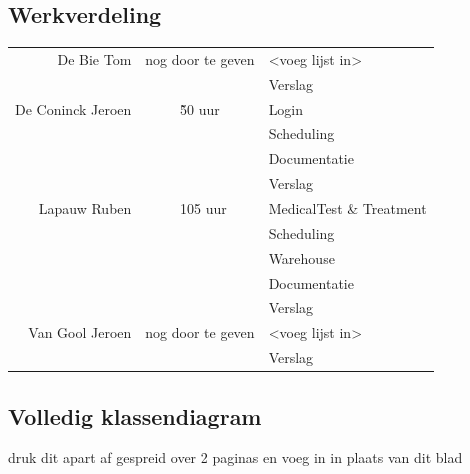 \documentclass[a4paper]{article}
\begin{document}
\subsection{Werkverdeling} %
\begin{center}
\begin{tabular}{| r || c | l |}
\hline
De Bie Tom & nog door te geven & <voeg lijst in> \\
~ & ~ & Verslag \\
\hline
De Coninck Jeroen & \~50 uur & Login \\
~ & ~ & Scheduling \\
~ & ~ & Documentatie \\
~ & ~ & Verslag \\
\hline
Lapauw Ruben & ~105 uur & MedicalTest \& Treatment \\
~ & ~ & Scheduling \\
~ & ~ & Warehouse \\
~ & ~ & Documentatie \\
~ & ~ & Verslag \\
\hline
Van Gool Jeroen & nog door te geven & <voeg lijst in> \\
~ & ~ & Verslag \\
\hline
\end{tabular}
\end{center}
\newpage
\subsection{Volledig klassendiagram \label{sec:classdiagram}}
druk dit apart af gespreid over 2 paginas en voeg in in plaats van dit blad
\newpage
\end{document}
